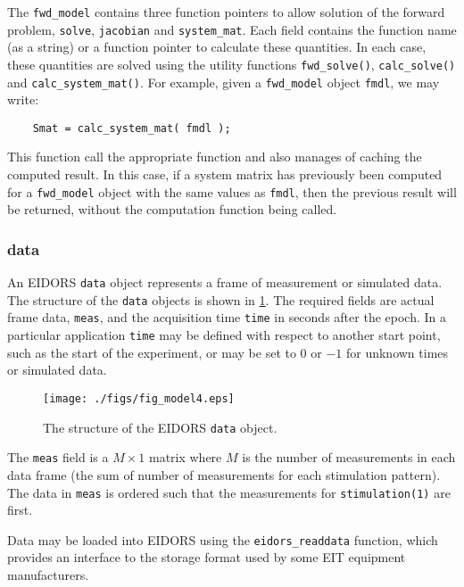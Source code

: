 \documentclass[12pt]{iopart}
\begin{document}
The {\tt fwd\_model} contains three function pointers
to allow solution of the forward problem,
{\tt solve},
{\tt jacobian} and
{\tt system\_mat}. Each field contains the function
name (as a string) or a function pointer to calculate
these quantities. In each case, these quantities
are solved using the utility functions 
{\tt fwd\_solve()}, 
{\tt calc\_solve()} and
{\tt calc\_system\_mat()}.
For example, given
a {\tt fwd\_model} object {\tt fmdl}, we may write:
\begin{verbatim}
    Smat = calc_system_mat( fmdl ); 
\end{verbatim}
This function 
call the appropriate function and also manages
of caching the computed result. In this case, if a
system matrix has previously been computed for
a {\tt fwd\_model} object with the same values
as {\tt fmdl}, then the previous result will be
returned, without the computation function being
called.


\subsubsection{data}

An EIDORS {\tt data} object represents a frame of
measurement or simulated data. The structure of the
{\tt data} objects is shown in \ref{fig:data}. The
required fields are actual frame data, {\tt meas},
and the acquisition time {\tt time} in seconds 
after the epoch. In a particular application {\tt time}
may be defined with respect to another start point, such as
the start of the experiment, or may be set to $0$ or $-1$ 
for unknown times or simulated data.

%
%
\begin{figure}[th]
\begin{flushright}
\texttt{[image: ./figs/fig\_model4.eps]}
\caption{\small The structure of the EIDORS {\tt data} object.
\label{fig:data}
 }
\end{flushright}
\end{figure}


The {\tt meas} field is a $M\times1$ matrix where
$M$ is the number of measurements in each data frame
(the sum of number of measurements for each stimulation
pattern). The data in {\tt meas} is ordered such that
the measurements for {\tt stimulation(1)} are first.

Data may be loaded into EIDORS using the {\tt eidors\_readdata}
function, which provides an interface to the storage
format used by some EIT equipment manufacturers.
\end{document}

